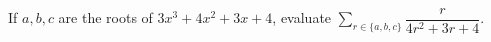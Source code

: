 If $a,b,c$ are the roots of $3x^3+4x^2+3x+4$, evaluate $\sum_{r\in\{a,b,c\}} \dfrac{r}{4r^2+3r+4}$.

